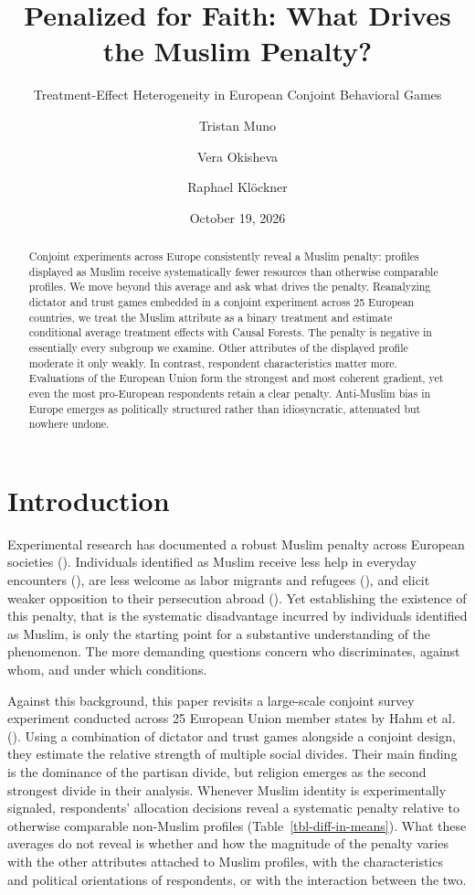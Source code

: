 \documentclass[
  10pt,
  a4paper,
  DIV=11,
  numbers=noendperiod]{scrartcl}
\title{Penalized for Faith: What Drives the Muslim Penalty?}
\subtitle{Treatment-Effect Heterogeneity in European Conjoint Behavioral
Games}
\author{Tristan Muno \and Vera Okisheva \and Raphael Klöckner}
\date{October 19, 2026}
\begin{document}
\maketitle
\begin{abstract}
Conjoint experiments across Europe consistently reveal a Muslim penalty:
profiles displayed as Muslim receive systematically fewer resources than
otherwise comparable profiles. We move beyond this average and ask what
drives the penalty. Reanalyzing dictator and trust games embedded in a
conjoint experiment across 25 European countries, we treat the Muslim
attribute as a binary treatment and estimate conditional average
treatment effects with Causal Forests. The penalty is negative in
essentially every subgroup we examine. Other attributes of the displayed
profile moderate it only weakly. In contrast, respondent characteristics
matter more. Evaluations of the European Union form the strongest and
most coherent gradient, yet even the most pro-European respondents
retain a clear penalty. Anti-Muslim bias in Europe emerges as
politically structured rather than idiosyncratic, attenuated but nowhere
undone.
\end{abstract}


\section{Introduction}\label{sec-introduction}

Experimental research has documented a robust Muslim penalty across
European societies (). Individuals identified as Muslim receive less help in everyday
encounters (), are less
welcome as labor migrants and refugees
(), and elicit
weaker opposition to their persecution abroad
(). Yet establishing
the existence of this penalty, that is the systematic disadvantage
incurred by individuals identified as Muslim, is only the starting point
for a substantive understanding of the phenomenon. The more demanding
questions concern who discriminates, against whom, and under which
conditions.

Against this background, this paper revisits a large-scale conjoint
survey experiment conducted across 25 European Union member states by
Hahm et al. (). Using a combination
of dictator and trust games alongside a conjoint design, they estimate
the relative strength of multiple social divides. Their main finding is
the dominance of the partisan divide, but religion emerges as the second
strongest divide in their analysis. Whenever Muslim identity is
experimentally signaled, respondents' allocation decisions reveal a
systematic penalty relative to otherwise comparable non-Muslim profiles
(Table~\ref{tbl-diff-in-means}). What these averages do not reveal is
whether and how the magnitude of the penalty varies with the other
attributes attached to Muslim profiles, with the characteristics and
political orientations of respondents, or with the interaction between
the two.
\end{document}
